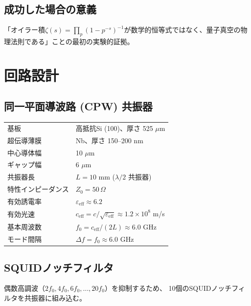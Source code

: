 \documentclass[12pt,a4paper]{article}
\begin{document}
\subsection{成功した場合の意義}

「オイラー積$\zeta(s) = \prod_p (1-p^{-s})^{-1}$が数学的恒等式ではなく、量子真空の物理法則である」ことの最初の実験的証拠。

\section{回路設計}

\subsection{同一平面導波路 (CPW) 共振器}

\begin{specbox}[CPW共振器仕様]
\begin{tabular}{ll}
基板 & 高抵抗Si (100)、厚さ 525 $\mu$m \\
超伝導薄膜 & Nb、厚さ 150--200 nm \\
中心導体幅 & 10 $\mu$m \\
ギャップ幅 & 6 $\mu$m \\
共振器長 & $L = 10$ mm ($\lambda/2$ 共振器) \\
特性インピーダンス & $Z_0 = 50\,\Omega$ \\
有効誘電率 & $\varepsilon_{\mathrm{eff}} \approx 6.2$ \\
有効光速 & $c_{\mathrm{eff}} = c/\sqrt{\varepsilon_{\mathrm{eff}}} \approx 1.2 \times 10^8$ m/s \\
基本周波数 & $f_0 = c_{\mathrm{eff}}/(2L) \approx 6.0$ GHz \\
モード間隔 & $\Delta f = f_0 \approx 6.0$ GHz \\
\end{tabular}
\end{specbox}

\subsection{SQUIDノッチフィルタ}

偶数高調波（$2f_0, 4f_0, 6f_0, \ldots, 20f_0$）を抑制するため、
10個のSQUIDノッチフィルタを共振器に組み込む。
\end{document}
